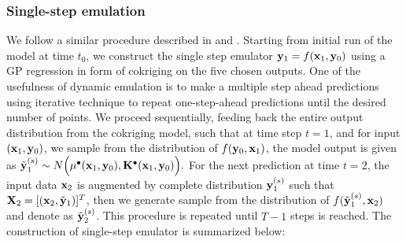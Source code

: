 \subsubsection{Single-step emulation}
We follow a similar procedure described in \citet{pd12} and \citet{pd15}. Starting from initial run of the model at time $t_0$, we construct the single step emulator ${\bf y}_1 = f({\bf x}_1, {\bf y}_{0})$ using a GP regression in form of cokriging on the five chosen outputs. One of the usefulness of dynamic emulation is to make a multiple step ahead predictions using iterative technique to repeat one-step-ahead predictions until the desired number of points. We proceed sequentially, feeding back the entire output distribution from the cokriging model, such that at time step $t=1$, and for input $({\bf x}_1,{\bf y}_0)$, we sample from the distribution of $f({\bf y}_0,{\bf x}_1)$, the model output is given as ${\tilde {\bf y}}^{(s)}_1 \sim N \Big(\mu^{\bullet}({\bf x}_1,{\bf y}_0), {\mathbf{K}}^{\bullet}({\bf x}_1,{\bf y}_0)\Big).$
For the next prediction at time $t=2$, the input data ${\bf x}_2$ is augmented by complete distribution ${\bf y}^{(s)}_1$ such that ${\bf X}_2=[({\bf x}_2,{\tilde {\bf y}}_1)]^T$,  then we generate sample from the distribution of $f({\tilde {\bf y}}^{(s)}_1,{\bf x}_2)$ and denote as ${\tilde {\bf y}}^{(s)}_2 $.%
This procedure is repeated until $T-1$ steps is reached. The construction of single-step emulator is summarized below:
